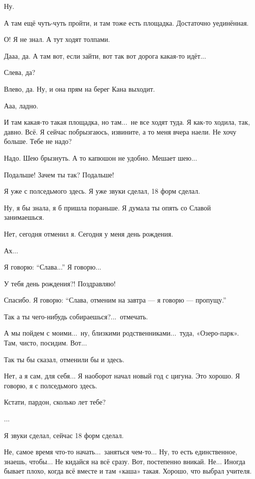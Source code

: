 \I
Ну.

\M
А там ещё чуть-чуть пройти, и там тоже есть площадка.
Достаточно уединённая.

\I
О! Я не знал.
А тут ходят толпами.

\M
Дааа, да.
А там вот, если зайти, вот так вот
дорога какая-то идёт...

\I
Слева, да?

\M
Влево, да.
Ну, и она прям на берег Кана выходит.

\I
Ааа, ладно.

\M
И там какая-то такая площадка, но там...\ не все ходят туда.
Я как-то ходила, так, давно.
Всё. Я сейчас побрызгаюсь, извините, а то меня вчера наели.
Не хочу больше. Тебе не надо?

\I
Надо. Шею брызнуть. А то капюшон не удобно.
Мешает шею...

\M
Подальше! Зачем ты так? Подальше!

\I
Я уже с полседьмого здесь. Я уже
звуки сделал, 18 форм сделал.

\M
Ну, я бы знала, я б пришла пораньше.
Я думала ты опять со Славой занимаешься.

\I
Нет, сегодня отменил я. Сегодня у меня день рождения.

\M
Ах...

\I
Я говорю: ``Слава...'' Я говорю...

\M
У тебя день рождения?! Поздравляю!

\I
Спасибо.
Я говорю: ``Слава, отменим на завтра --- я говорю --- пропущу.''

\M
Так а ты чего-нибудь собираешься?...\ отмечать.

\I
А мы пойдем с моими...\ ну, близкими родственниками...\ туда, «Озеро-парк».
Там, чисто, посидим. Вот...

\M
Так ты бы сказал, отменили бы и здесь.

\I
Нет, а я сам, для себя...
Я наоборот начал новый год с цигуна. Это хорошо.
Я говорю, я с полседьмого здесь.

\M
Кстати, пардон, сколько лет тебе?


...

\I
Я звуки сделал, сейчас 18 форм сделал.

\M
Не, самое время что-то начать...\ заняться чем-то...
Ну, то есть единственное, знаешь, чтобы... Не кидайся на всё сразу.
Вот, постепенно вникай. Не... Иногда
бывает плохо, когда всё вместе и там «каша» такая. Хорошо, что выбрал учителя.


